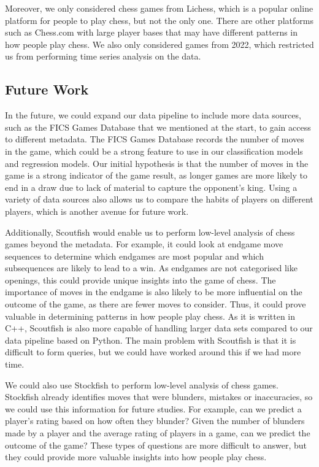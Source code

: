 \documentclass[a4paper, 11pt]{article}
\begin{document}
Moreover, we only considered chess games from Lichess, which is a popular online platform for people to play chess, but not the only one. There are other platforms such as Chess.com with large player bases that may have different patterns in how people play chess. We also only considered games from 2022, which restricted us from performing time series analysis on the data.

\subsection{Future Work}
In the future, we could expand our data pipeline to include more data sources, such as the FICS Games Database that we mentioned at the start, to gain access to different metadata. The FICS Games Database records the number of moves in the game, which could be a strong feature to use in our classification models and regression models. Our initial hypothesis is that the number of moves in the game is a strong indicator of the game result, as longer games are more likely to end in a draw due to lack of material to capture the opponent's king. Using a variety of data sources also allows us to compare the habits of players on different players, which is another avenue for future work.

Additionally, Scoutfish would enable us to perform low-level analysis of chess games beyond the metadata. For example, it could look at endgame move sequences to determine which endgames are most popular and which subsequences are likely to lead to a win. As endgames are not categorised like openings, this could provide unique insights into the game of chess. The importance of moves in the endgame is also likely to be more influential on the outcome of the game, as there are fewer moves to consider. Thus, it could prove valuable in determining patterns in how people play chess. As it is written in C++, Scoutfish is also more capable of handling larger data sets compared to our data pipeline based on Python. The main problem with Scoutfish is that it is difficult to form queries, but we could have worked around this if we had more time.

We could also use Stockfish to perform low-level analysis of chess games. Stockfish already identifies moves that were blunders, mistakes or inaccuracies, so we could use this information for future studies. For example, can we predict a player's rating based on how often they blunder? Given the number of blunders made by a player and the average rating of players in a game, can we predict the outcome of the game? These types of questions are more difficult to answer, but they could provide more valuable insights into how people play chess.
\end{document}

